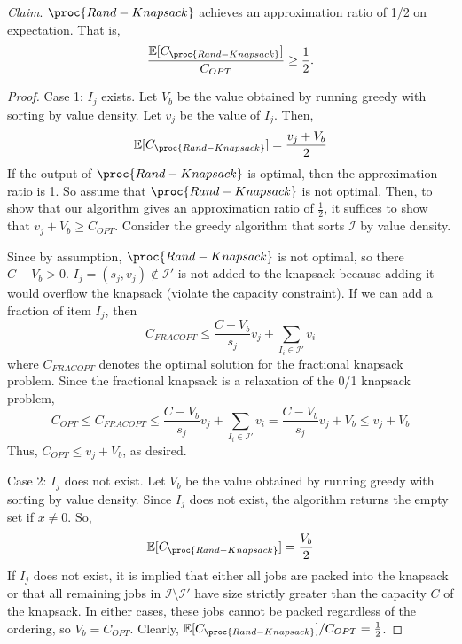 \documentclass[11pt]{article}
\newcommand{\Exp}{\mathbb{E}}
\begin{document}
\begin{enumerate}[leftmargin=16pt]
\begin{enumerate}[leftmargin=16pt]
        \textit{Claim}. $\proc{Rand-Knapsack}$ achieves an approximation ratio of 1/2 on expectation. That is, 
        $$
        \frac{\Exp[C_{\proc{Rand-Knapsack}}]}{C_{OPT}} \geq \frac{1}{2}.
        $$

        \begin{proof}
            \hfill

            Case 1: $I_j$ exists. Let $V_b$ be the value obtained by running greedy with sorting by value density. Let $v_j$ be the value of $I_j$. Then,
            $$
            \Exp[C_{\proc{Rand-Knapsack}}] = \frac{v_j + V_b}{2}
            $$
            If the output of $\proc{Rand-Knapsack}$ is optimal, then the approximation ratio is 1. So assume that $\proc{Rand-Knapsack}$ is not optimal. Then, to show that our algorithm gives an approximation ratio of $\frac{1}{2}$, it suffices to show that $v_j + V_b \geq C_{OPT}$. Consider the greedy algorithm that sorts $\mathcal{I}$ by value density.
            
            Since by assumption, $\proc{Rand-Knapsack}$ is not optimal, so there $C - V_b > 0$.  $I_j = (s_j, v_j) \not\in \mathcal{I}'$ is not added to the knapsack because adding it would overflow the knapsack (violate the capacity constraint). If we can add a fraction of item $I_j$, then
            $$
            C_{FRACOPT} \leq \frac{C - V_b}{s_j} v_j + \sum_{I_i \in \mathcal{I}'} v_i
            $$
            where $C_{FRACOPT}$ denotes the optimal solution for the fractional knapsack problem. Since the fractional knapsack is a relaxation of the 0/1 knapsack problem,
            $$
            C_{OPT} \leq C_{FRACOPT} \leq \frac{C - V_b}{s_j} v_j + \sum_{I_i \in \mathcal{I}'} v_i = \frac{C - V_b}{s_j} v_j + V_b \leq v_j + V_b
            $$
            Thus, $C_{OPT} \leq v_j + V_b$, as desired.

            \hfill

            Case 2: $I_j$ does not exist. Let $V_b$ be the value obtained by running greedy with sorting by value density. Since $I_j$ does not exist, the algorithm returns the empty set if $x \neq 0$. So,
            $$
            \Exp[C_{\proc{Rand-Knapsack}}] = \frac{V_b}{2}
            $$
            If $I_j$ does not exist, it is implied that either all jobs are packed into the knapsack or that all remaining jobs in $\mathcal{I} \setminus \mathcal{I}'$ have size strictly greater than the capacity $C$ of the knapsack. In either cases, these jobs cannot be packed regardless of the ordering, so $V_b = C_{OPT}$. Clearly, $\Exp[C_{\proc{Rand-Knapsack}}] / C_{OPT} = \frac{1}{2}$.
        \end{proof}


\end{enumerate}
\end{enumerate}
\end{document}
